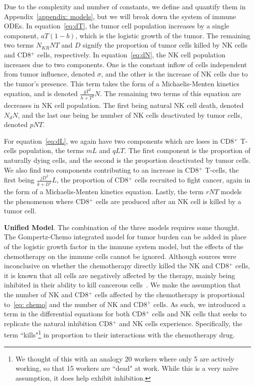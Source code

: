 \documentclass[11pt]{amsart}
\begin{document}
Due to the complexity and number of constants, we define and quantify them in Appendix\ \ref{appendix: models}, but we will break down the system of immune ODEs. 
In equation\ \eqref{eq:dT}, the tumor cell population increases by a single component, $aT(1-b)$, which is the logistic growth  of the tumor. The remaining two terms $N_{KR}NT$ and $D$ signify the proportion of tumor cells killed by NK cells and CD8$^+$ cells, respectively.
In equation\ \eqref{eq:dN}, the NK cell population increases due to two components. One is the constant inflow of cells independent from tumor influence, denoted $\sigma$, and the other is the increase of NK cells due to the tumor's presence. This term takes the form of a Michaelis-Menten kinetics equation, and is denoted $\frac{gT^2}{h + T^2}N$. The remaining two terms of this equation are decreases in NK cell population. The first being natural NK cell death, denoted $N_dN$, and the last one being he number of NK cells deactivated by tumor cells, denoted $pNT$.

For equation\ \eqref{eq:dL}, we again have two components which are loses in CD8$^+$ T-cells population, the terms $mL$ and $qLT$. The first component is the proportion of naturally dying cells, and the second is the proportion deactivated by tumor cells. We also find two components contributing to an increase in CD8$^+$ T-cells, the first being $\frac{jD^2}{k + D^2}L$, the proportion of CD8$^+$ cells recruited to fight cancer, again in the form of a Michaelis-Menten kinetics equation. Lastly, the term $rNT$ models the phenomenon where CD8$^+$ cells are produced after an NK cell is killed by a tumor cell. 


\textbf{Unified Model}. The combination of the three models requires some thought.
The Gompertz-Chemo integrated model for tumor burden can be added in place of the logistic growth factor in the immune system model, but the effects of the chemotherapy on the immune cells cannot be ignored.
Although sources were inconclusive on whether the chemotherapy directly killed the NK and CD8$^+$ cells, it is known that all cells are negatively affected by the therapy, mainly being inhibited in their ability to kill cancerous cells\ \cite{RebeCytoChemonImmune}.
We make the assumption that the number of NK and CD8$^+$ cells affected by the chemotherapy is proportional to\ \eqref{eq: chemo} and the number of NK and CD8$^+$ cells. 
As such, we introduced a term in the differential equations for both CD8$^+$ cells and NK cells that seeks to replicate the natural inhibition CD8$^+$ and NK cells experience.
Specifically, the term ``kills"\footnote{We thought of this with an analogy 20 workers where only 5 are actively working, so that 15 workers are ``dead" at work. While this is a very naïve assumption, it does help exhibit inhibition.} in proportion to their interactions with the chemotherapy drug.
\end{document}
